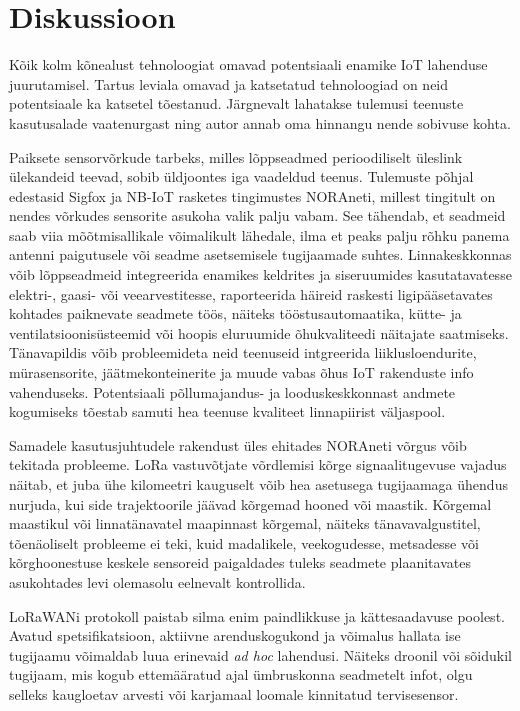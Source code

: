 \documentclass[12pt]{article}
\begin{document}
    \newpage

    \section{Diskussioon}

    Kõik kolm kõnealust tehnoloogiat omavad potentsiaali enamike IoT lahenduse juurutamisel.
    Tartus leviala omavad ja katsetatud tehnoloogiad on neid potentsiaale ka katsetel tõestanud.
    Järgnevalt lahatakse tulemusi teenuste kasutusalade vaatenurgast ning autor annab oma hinnangu nende sobivuse kohta.

    Paiksete sensorvõrkude tarbeks, milles lõppseadmed perioodiliselt üleslink ülekandeid teevad, sobib üldjoontes iga vaadeldud teenus.
    Tulemuste põhjal edestasid Sigfox ja NB-IoT rasketes tingimustes NORAneti, millest tingitult on nendes võrkudes sensorite asukoha valik palju vabam.
    See tähendab, et seadmeid saab viia mõõtmisallikale võimalikult lähedale, ilma et peaks palju rõhku panema antenni paigutusele või seadme asetsemisele tugijaamade suhtes.
    Linnakeskkonnas võib lõppseadmeid integreerida enamikes keldrites ja siseruumides kasutatavatesse elektri-, gaasi- või veearvestitesse, raporteerida häireid raskesti ligipääsetavates kohtades paiknevate seadmete töös, näiteks tööstusautomaatika, kütte- ja ventilatsioonisüsteemid või hoopis eluruumide õhukvaliteedi näitajate saatmiseks.
    Tänavapildis võib probleemideta neid teenuseid intgreerida liiklusloendurite, mürasensorite, jäätmekonteinerite ja muude vabas õhus IoT rakenduste info vahenduseks.
    Potentsiaali põllumajandus- ja looduskeskkonnast andmete kogumiseks tõestab samuti hea teenuse kvaliteet linnapiirist väljaspool.

    Samadele kasutusjuhtudele rakendust üles ehitades NORAneti võrgus võib tekitada probleeme.
    LoRa vastuvõtjate võrdlemisi kõrge signaalitugevuse vajadus näitab, et juba ühe kilomeetri kauguselt võib hea asetusega tugijaamaga ühendus nurjuda, kui side trajektoorile jäävad kõrgemad hooned või maastik.
    Kõrgemal maastikul või linnatänavatel maapinnast kõrgemal, näiteks tänavavalgustitel, tõenäoliselt probleeme ei teki, kuid madalikele, veekogudesse, metsadesse või kõrghoonestuse keskele sensoreid paigaldades tuleks seadmete plaanitavates asukohtades levi olemasolu eelnevalt kontrollida.

    LoRaWANi protokoll paistab silma enim paindlikkuse ja kättesaadavuse poolest.
    Avatud spetsifikatsioon, aktiivne arenduskogukond ja võimalus hallata ise tugijaamu võimaldab luua erinevaid \textit{ad hoc} lahendusi.
    Näiteks droonil või sõidukil tugijaam, mis kogub ettemääratud ajal ümbruskonna seadmetelt infot, olgu selleks kaugloetav arvesti või karjamaal loomale kinnitatud tervisesensor.
\end{document}
